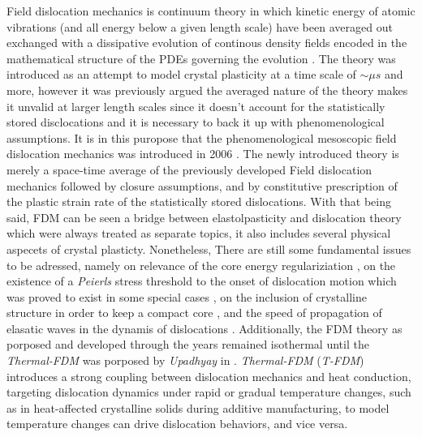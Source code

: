\documentclass{article}
\begin{document}
Field dislocation mechanics is continuum theory in which kinetic energy of atomic vibrations (and all energy below a given length scale) have been averaged out exchanged with a dissipative evolution of continous density fields encoded in the mathematical structure of the PDEs governing the evolution \parencite{acharyaNewinroads2010}. The theory was introduced as an attempt to model crystal plasticity at a time scale of $\sim \mu s$ and more, however it was previously argued the averaged nature of the theory makes it unvalid at larger length scales since it doesn't account for the statistically stored disclocations and it is necessary to back it up with phenomenological assumptions. It is in this puropose that the phenomenological mesoscopic field dislocation mechanics was introduced in 2006 \parencite{acharyaSizeeffects2006}. The newly introduced theory is merely a space-time average of the previously developed Field dislocation mechanics followed by closure assumptions, and by constitutive prescription of the plastic strain rate of the statistically stored dislocations. With that being said, FDM can be seen a bridge between elastolpasticity and dislocation theory which were always treated as separate topics, it also includes several physical aspecets of crystal plasticty. Nonetheless, There are still some fundamental issues to be adressed, namely on relevance of the core energy regulariziation \parencite{acharyaequationtheory}, on the existence of a \emph{Peierls} stress threshold to the onset of  dislocation motion which was proved to exist in some special cases \parencite{acharyaNewinroads2010} \parencite{zhangsingletheory2015}, on the inclusion of crystalline structure in order to keep a compact core \parencite{acharyaNewinroads2010}, and the speed of propagation of elasatic waves in the dynamis of dislocations \parencite{zhangsingletheory2015}. Additionally, the FDM theory as porposed and developed through the years remained isothermal until the \emph{Thermal-FDM} was porposed by \emph{Upadhyay} in \parencite{upadhyaythermomechanicaltheory2020}. \emph{Thermal-FDM} (\emph{T-FDM}) introduces a strong coupling between dislocation mechanics and heat conduction, targeting dislocation dynamics under rapid or gradual temperature changes, such as in heat-affected crystalline solids during additive manufacturing, to model temperature changes can drive dislocation behaviors, and vice versa.\\
\end{document}
